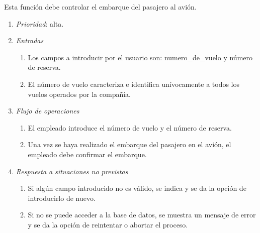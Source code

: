

	Esta función debe controlar el embarque del pasajero al avión.

	\begin{enumerate}
		\item \textit{Prioridad}: alta.
		\item \textit{Entradas}
		\begin{enumerate}
			\item Los campos a introducir por el usuario son: \gls{numero_de_vuelo} y número de reserva.
			\item El número de vuelo caracteriza e identifica unívocamente a todos los vuelos operados por la compañía.
		\end{enumerate}
		\item \textit{Flujo de operaciones}
		\begin{enumerate}
			\item El empleado introduce el número de vuelo y el número de reserva.
			\item Una vez se haya realizado el embarque del pasajero en el avión, el empleado debe confirmar el embarque.
		\end{enumerate}
		\item \textit{Respuesta a situaciones no previstas}
		\begin{enumerate}
			\item Si algún campo introducido no es válido, se indica y se da la opción de introducirlo de nuevo.
			\item Si no se puede acceder a la base de datos, se muestra un mensaje de error y se da la opción de reintentar o abortar el proceso.
		\end{enumerate}
	\end{enumerate}
